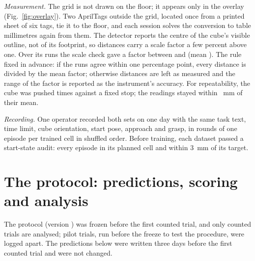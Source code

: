 \emph{Measurement.}
The grid is not drawn on the floor; it appears only in the overlay (Fig.~\ref{fig:overlay}). Two AprilTags outside the grid, located once from a printed sheet of six tags, tie it to the floor, and each session solves the conversion to table millimetres again from them. %
The detector reports the centre of the cube's visible outline, not of its footprint, so distances carry a scale factor a few percent above one.
Over its \nScaleRuns runs the scale check gave a factor between \scaleFactorMin and \scaleFactorMax (mean \scaleFactor). %
The rule fixed in advance: if the runs agree within one percentage point, every distance is divided by the mean factor; otherwise distances are left as measured and the range of the factor is reported as the instrument's accuracy.
For repeatability, the cube was pushed \nRepeatability times against a fixed stop; the readings stayed within \repeatabilityScatter~mm of their mean. %

\emph{Recording.}
One operator recorded both sets on one day with the same task text, time limit, cube orientation, start pose, approach and grasp, in rounds of one episode per trained cell in shuffled order. %
Before training, each dataset passed a start-state audit: every episode in its planned cell and within 3~mm of its target. %

\section{The protocol: predictions, scoring and analysis}
\label{app:protocol}
The protocol (version \protocolVersion) was frozen before the first counted trial, and only counted trials are analysed; pilot trials, run before the freeze to test the procedure, were logged apart. %
The predictions below were written three days before the first counted trial and were not changed. %

